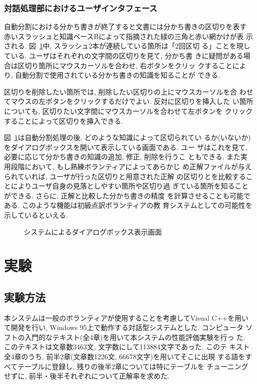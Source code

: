 \subsubsection{対話処理部におけるユーザインタフェース}
自動分割における分かち書きが終了すると文書には分かち書きの区切りを表す
赤いスラッシュと知識ベースBによって指摘された緑の三角と赤い網かけが表
示される. 図~\ref{実行例}中, スラッシュ2本が連続している箇所は「2回区切
る」ことを現している. ユーザはそれぞれの文字間の区切りを見て, 分かち書
きに疑問がある場合は区切り箇所にマウスカーソルを合わせ, 右ボタンをクリッ
クすることにより, 自動分割で使用されている分かち書きの知識を知ることが
できる. 

区切りを削除したい箇所では, 削除したい区切りの上にマウスカーソルを合
わせてマウスの左ボタンをクリックするだけでよい. 反対に区切りを挿入した
い箇所についても, 区切りたい文字間にマウスカーソルを合わせて左ボタンを
クリックすることによって区切りを挿入できる. 

図~\ref{実行例}は自動分割処理の後, どのような知識によって区切られてい
るか(いないか)をダイアログボックスを開いて表示している画面である. ユー
ザはこれを見て, 必要に応じて分かち書きの知識の追加, 修正, 削除を行うこ
ともできる. また実用段階において, もし熟練ボランティアによってあらかじ
め正解ファイルが与えられていれば, ユーザが行った区切りと用意された正解
の区切りとを比較することによりユーザ自身の見落としやすい箇所や区切り過
ぎている箇所を知ることができる. さらに, 正解と比較した分かち書きの精度
を計算させることも可能である. このような機能は初級点訳ボランティアの教
育システムとしての可能性を示しているといえる. 


\begin{figure}[bht]
\begin{center}
\vspace{3mm}
\caption{システムによるダイアログボックス表示画面}
\label{実行例}
\end{center}
\end{figure}

\section{実験}
\subsection{実験方法}
本システムは一般のボランティアが使用することを考慮してVisual C++を用い
て開発を行い, Windows 95上で動作する対話型システムとした. コンピュータ
ソフトの入門的なテキスト(全4章)を用いて本システムの性能評価実験を行っ
た. このテキストは文章数3463文, 文字数にして113884文字であった. このテ
キスト全4章のうち, 前半2章(文章数1226文, 66678文字)を用いてそこに出現
する語をすべてテーブルに登録し, 残りの後半2章については特にテーブルを
チューニングせずに, 前半・後半それぞれについて正解率を求めた. 

